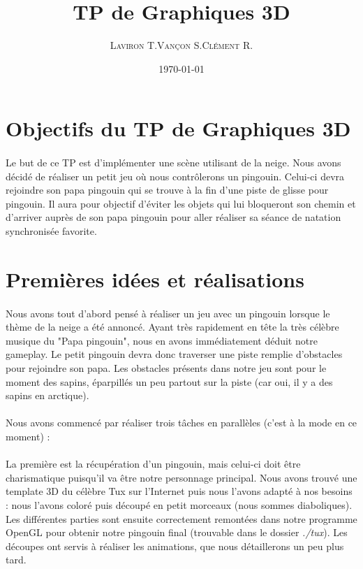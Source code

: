 \documentclass[11pt]{article}
\title{\textbf{TP de Graphiques 3D}}
\author{
  \begin{tabular}{ccc}
    \textsc{Laviron T.} & \textsc{Vançon S.} & \textsc{Clément R.}\\
\end{tabular}}
\date{\small \today}
\begin{document}
    \maketitle

    \section*{\bf Objectifs du TP de Graphiques 3D}
    \paragraph{}
    Le but de ce TP est d'implémenter une scène utilisant de la neige.
    Nous avons décidé de réaliser un petit jeu où nous contrôlerons un pingouin.
    Celui-ci devra rejoindre son papa pingouin qui se trouve à la fin d'une piste de glisse pour pingouin.
    Il aura pour objectif  d'éviter les objets qui lui bloqueront son chemin et d'arriver auprès de son papa pingouin pour aller réaliser
    sa séance de natation synchronisée favorite.

    \section{Premières idées et réalisations}

    \paragraph{}
    Nous avons tout d'abord pensé à réaliser un jeu avec un pingouin lorsque le thème de la neige a été annoncé.
    Ayant très rapidement en tête la très célèbre musique du "Papa pingouin", nous en avons immédiatement déduit notre gameplay.
    Le petit pingouin devra donc traverser une piste remplie d'obstacles pour rejoindre son papa.
    Les obstacles présents dans notre jeu sont pour le moment des sapins, éparpillés un peu partout sur la piste (car oui, il y a des sapins en arctique).

    \paragraph{}
    Nous avons commencé par réaliser trois tâches en parallèles (c'est à la mode en ce moment) :

    \paragraph{}
    La première est la récupération d'un pingouin, mais celui-ci doit être charismatique puisqu'il va être notre personnage principal.
    Nous avons trouvé une template 3D du célèbre Tux sur l'Internet puis nous l'avons adapté à nos besoins : nous l'avons coloré puis découpé en petit morceaux (nous sommes diaboliques).
    Les différentes parties sont ensuite correctement remontées dans notre programme OpenGL pour obtenir notre pingouin final (trouvable dans le dossier \textit{./tux}).
    Les découpes ont servis à réaliser les animations, que nous détaillerons un peu plus tard.
\end{document}
